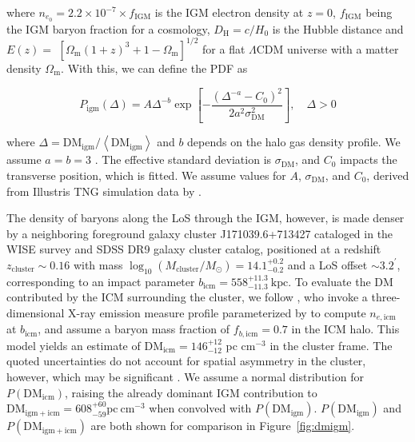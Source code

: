 \documentclass[twocolumn, linenumbers, tra]{aastex631}
\begin{document}
\noindent
where $n_{e_0}=2.2 \times 10^{-7} \times f_{\mathrm{IGM}}$ is the IGM electron density at $z=0$, $f_{\mathrm{IGM}}$ being the IGM baryon fraction for a \cite{Planck2018} cosmology, $D_{\mathrm{H}}=c / H_0$ is the Hubble distance and $E(z)=$ $\left[\Omega_{\mathrm{m}}(1+z)^3+1-\Omega_{\mathrm{m}}\right]^{1 / 2}$ for a flat $\Lambda$CDM universe with a matter density $\Omega_{\mathrm{m}}$. With this, we can define the PDF as

\begin{equation}\label{eq:Pdmigm}
P_{\mathrm{igm}}(\Delta) = A \Delta^{-b} \exp \left[-\frac{\left(\Delta^{-a}-C_0\right)^2}{2 a^2 \sigma_{\mathrm{DM}}^2}\right], \quad \Delta>0
\end{equation}

\noindent
where $\Delta=\mathrm{DM}_{\mathrm{igm}} /\left\langle\mathrm{DM}_{\mathrm{igm}}\right\rangle$ and $b$ depends on the halo gas density profile. We assume $a = b = 3$ \citep{Macquart2020}. The effective standard deviation is $\sigma_{\mathrm{DM}}$, and $C_0$ impacts the transverse position, which is fitted. We assume values for $A$, $\sigma_{\mathrm{DM}}$, and $C_0$, derived from Illustris TNG simulation data by \citet{Zhang2021}. 

The density of baryons along the LoS through the IGM, however, is made denser by a neighboring foreground galaxy cluster J171039.6+713427 cataloged in the WISE survey and {SDSS DR9 galaxy cluster catalog}, positioned at a redshift $z_{\mathrm{cluster}} \sim 0.16$ with mass $\log_{10}(M_{\mathrm{cluster}}/M_\odot) = 14.1^{+0.2}_{-0.2}$ \citep[we adopt the quoted 0.2 dex uncertainty for cluster masses $\mathrm{log}_{10}\left(M_{\mathrm{cluster}}/M_\odot\right) \gtrsim 14$ in][]{Wen2018} and a LoS offset $ \sim 3.2^{\prime}$, corresponding to an impact parameter $b_{\mathrm{icm}} = 558^{+11.3}_{-11.3}\ \mathrm{kpc}$. To evaluate the DM contributed by the ICM surrounding the cluster, we follow \citet{Prochaska2019b}, who invoke a three-dimensional X-ray emission measure profile parameterized by \citet{Vikhlinin2006} to compute $n_{e, \mathrm{icm}}$ at $b_{\mathrm{icm}}$, and assume a baryon mass fraction of $f_{b, \mathrm{icm}} = 0.7$ in the ICM halo. This model yields an estimate of $\mathrm{DM}_{\mathrm{icm}} = 146^{+12}_{-12}$ pc cm$^{-3}$ in the cluster frame. The quoted uncertainties do not account for spatial asymmetry in the cluster, however, which may be significant \citep{Connor2023}. We assume a normal distribution for $P(\mathrm{DM}_{\mathrm{icm}})$, raising the already dominant IGM contribution to $\mathrm{DM}_{\mathrm{igm+icm}} = 608_{-59}^{+60} \mathrm{pc \ cm}^{-3}$ when convolved with $P(\mathrm{DM}_{\mathrm{igm}})$. $P\left(\mathrm{DM}_{\mathrm{igm}}\right)$ and $P\left(\mathrm{DM}_{\mathrm{igm+icm}}\right)$ are both shown for comparison in Figure\ \ref{fig:dmigm}.
\end{document}
